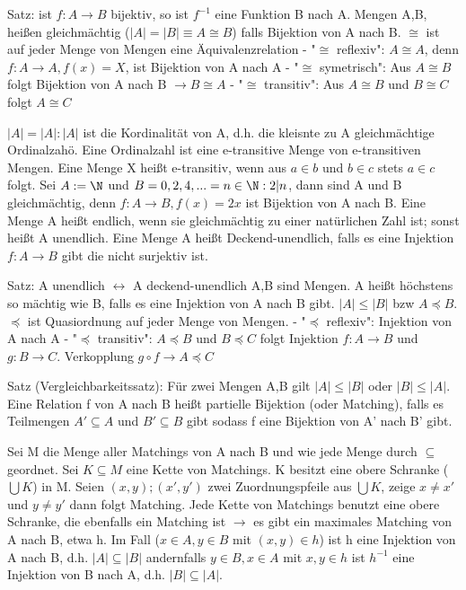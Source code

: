 \documentclass[10pt,landscape]{article}
\begin{document}
\begin{multicols}{3}
{Satz: ist $f:A\rightarrow B$ bijektiv, so ist $f^{-1}$ eine Funktion B nach A. Mengen A,B, heißen gleichmächtig ($|A|=|B| \equiv A\cong B$) falls Bijektion von A nach B. $\cong$ ist auf jeder Menge von Mengen eine Äquivalenzrelation
- "$\cong$ reflexiv": $A\cong A$, denn $f:A\rightarrow A, f(x)=X$, ist Bijektion von A nach A
- "$\cong$ symetrisch": Aus $A\cong B$ folgt Bijektion von A nach B $\rightarrow B\cong A$
- "$\cong$ transitiv": Aus $A\cong B$ und $B\cong C$ folgt $A\cong C$

$|A|=|A|:|A|$ ist die Kordinalität von A, d.h. die kleisnte zu A gleichmächtige Ordinalzahö. Eine Ordinalzahl ist eine e-transitive Menge von e-transitiven Mengen. Eine Menge X heißt e-transitiv, wenn aus $a\in b$ und $b\in c$ stets $a\in c$ folgt.
Sei $A:=\N$ und $B={0,2,4,...}={n\in \N: 2|n}$, dann sind A und B gleichmächtig, denn $f:A\rightarrow B, f(x)=2x$ ist Bijektion von A nach B.
Eine Menge A heißt endlich, wenn sie gleichmächtig zu einer natürlichen Zahl ist; sonst heißt A unendlich.
Eine Menge A heißt Deckend-unendlich, falls es eine Injektion $f:A\rightarrow B$ gibt die nicht surjektiv ist.

Satz: A unendlich $\leftrightarrow$ A deckend-unendlich
A,B sind Mengen. A heißt höchstens so mächtig wie B, falls es eine Injektion von A nach B gibt. $|A|\leq |B|$ bzw $A\preceq B$. $\preceq$ ist Quasiordnung auf jeder Menge von Mengen.
- "$\preceq$ reflexiv": Injektion von A nach A
- "$\preceq$ transitiv": $A\preceq B$ und $B\preceq C$ folgt Injektion $f:A\rightarrow B$ und $g:B\rightarrow C$. Verkopplung $g \circ f \rightarrow A \preceq C$

Satz (Vergleichbarkeitssatz):
Für zwei Mengen A,B gilt $|A|\leq |B|$ oder $|B| \leq |A|$. Eine Relation f von A nach B heißt partielle Bijektion (oder Matching), falls es Teilmengen $A'\subseteq A$ und $B'\subseteq B$ gibt sodass f eine Bijektion von A' nach B' gibt.

Sei M die Menge aller Matchings von A nach B und wie jede Menge durch $\subseteq$ geordnet. Sei $K\subseteq M$ eine Kette von Matchings. K besitzt eine obere Schranke ($\bigcup K$) in M. Seien $(x,y);(x',y')$ zwei Zuordnungspfeile aus $\bigcup K$, zeige $x\not = x'$ und $y\not = y'$ dann folgt Matching.
Jede Kette von Matchings benutzt eine obere Schranke, die ebenfalls ein Matching ist $\rightarrow$ es gibt ein maximales Matching von A nach B, etwa h. Im Fall ($x\in A, y\in B$ mit $(x,y)\in h$) ist h eine Injektion von A nach B, d.h. $|A| \subseteq |B|$ andernfalls $y\in B, x\in A$ mit $x,y\in h$ ist $h^{-1}$ eine Injektion von B nach A, d.h. $|B| \subseteq |A|$.

}
\end{multicols}
\end{document}
